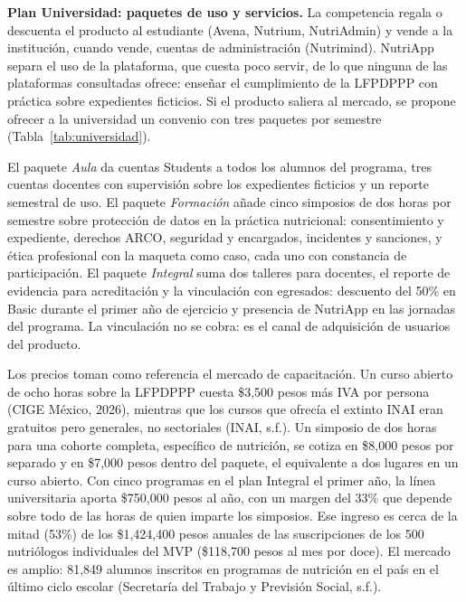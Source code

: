 \documentclass[12pt, a4paper]{article}
\begin{document}
\textbf{Plan Universidad: paquetes de uso y servicios.} La competencia
regala o descuenta el producto al estudiante (Avena, Nutrium,
NutriAdmin) y vende a la institución, cuando vende, cuentas de
administración (Nutrimind). NutriApp separa el uso de la plataforma, que
cuesta poco servir, de lo que ninguna de las plataformas consultadas
ofrece: enseñar el cumplimiento de la LFPDPPP con práctica sobre
expedientes ficticios. Si el producto saliera al mercado, se propone
ofrecer a la universidad un convenio con tres paquetes por semestre
(Tabla~\ref{tab:universidad}).

El paquete \textit{Aula} da cuentas Students a todos los alumnos del
programa, tres cuentas docentes con supervisión sobre los expedientes
ficticios y un reporte semestral de uso. El paquete \textit{Formación}
añade cinco simposios de dos horas por semestre sobre protección de
datos en la práctica nutricional: consentimiento y expediente, derechos
ARCO, seguridad y encargados, incidentes y sanciones, y ética
profesional con la maqueta como caso, cada uno con constancia de
participación. El paquete
\textit{Integral} suma dos talleres para docentes, el reporte de
evidencia para acreditación y la vinculación con egresados: descuento
del 50\% en Basic durante el primer año de ejercicio y presencia de
NutriApp en las jornadas del programa. La vinculación no se cobra: es el
canal de adquisición de usuarios del producto.
 
Los precios toman como referencia el mercado de capacitación. Un curso
abierto de ocho horas sobre la LFPDPPP cuesta \$3,500 pesos más IVA por
persona (CIGE México, 2026), mientras que los cursos que ofrecía el
extinto INAI eran gratuitos pero generales, no sectoriales (INAI,
s.f.). Un simposio de dos horas para una cohorte
completa, específico de nutrición, se cotiza en \$8,000 pesos por
separado y en \$7,000 pesos dentro del paquete, el equivalente a dos
lugares en un curso abierto. Con cinco programas en el plan Integral el
primer año, la línea universitaria aporta \$750,000 pesos al año, con un
margen del 33\% que depende sobre todo de las horas de quien imparte los
simposios. Ese ingreso es cerca de la mitad (53\%) de los \$1,424,400
pesos anuales de las suscripciones de los 500 nutriólogos individuales
del MVP (\$118,700 pesos al mes por doce). El mercado es amplio: 81,849
alumnos inscritos en programas de nutrición en el país en el último
ciclo escolar (Secretaría del Trabajo y Previsión Social, s.f.).
 
\end{document}
